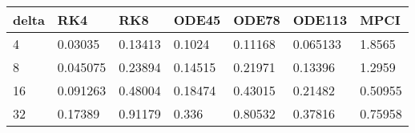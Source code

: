 \begin{tabular}{lllllll}
delta & RK4 & RK8 & ODE45 & ODE78 & ODE113 & MPCI \\ 
\hline 
4 & 0.03035 & 0.13413 & 0.1024 & 0.11168 & 0.065133 & 1.8565 \\ 
8 & 0.045075 & 0.23894 & 0.14515 & 0.21971 & 0.13396 & 1.2959 \\ 
16 & 0.091263 & 0.48004 & 0.18474 & 0.43015 & 0.21482 & 0.50955 \\ 
32 & 0.17389 & 0.91179 & 0.336 & 0.80532 & 0.37816 & 0.75958 \\ 
\hline 
\end{tabular}